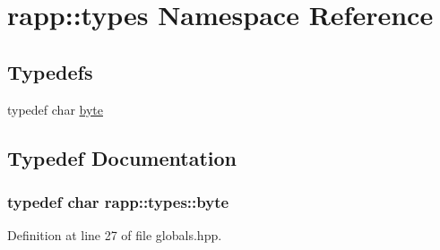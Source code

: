 \hypertarget{namespacerapp_1_1types}{\section{rapp\-:\-:types Namespace Reference}
\label{namespacerapp_1_1types}
}
\subsection*{Typedefs}
\begin{DoxyCompactItemize}
\item 
typedef char \hyperlink{namespacerapp_1_1types_a1dbc9dc2ab4507d8fb58ac3a204d307b}{byte}
\end{DoxyCompactItemize}


\subsection{Typedef Documentation}
\hypertarget{namespacerapp_1_1types_a1dbc9dc2ab4507d8fb58ac3a204d307b}{
\subsubsection[{byte}]{\setlength{\rightskip}{0pt plus 5cm}typedef char {\bf rapp\-::types\-::byte}}}\label{namespacerapp_1_1types_a1dbc9dc2ab4507d8fb58ac3a204d307b}


Definition at line 27 of file globals.\-hpp.

